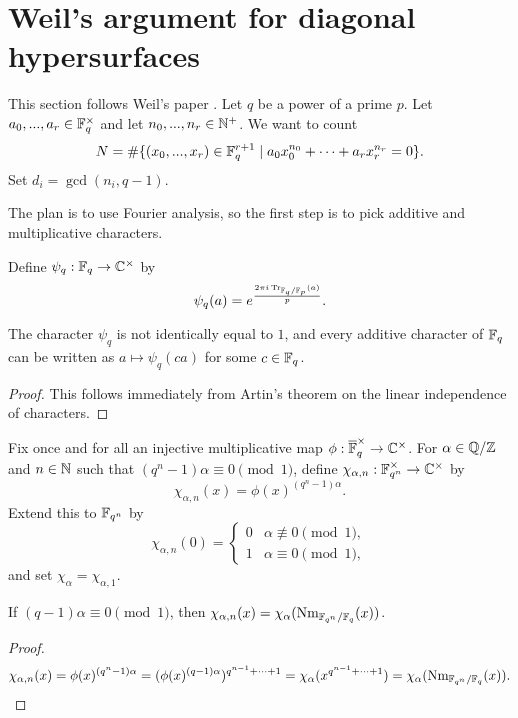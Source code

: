 \section{Weil's argument for diagonal hypersurfaces}

This section follows Weil's paper \cite{weil}. Let $q$ be a power of a prime $p$. Let $a_0, ..., a_r \in \mathbb{F}_q^\times$ and let $n_0, ..., n_r \in \mathbb{N}^+$. We want to count
\[
N = \#\{(x_0, ..., x_r)\in \mathbb{F}_q^{r+1} \mid a_0x_0^{n_0} + \cdots + a_rx_r^{n_r} = 0\}.
\]
Set $d_i = \gcd(n_i,q-1)$.

The plan is to use Fourier analysis, so the first step is to pick additive and multiplicative characters.

\begin{defn} Define $\psi_q:\mathbb{F}_q \rightarrow \mathbb{C}^\times$ by
\[
\psi_q(a) = e^{\frac{2\pi i\operatorname{Tr}_{\mathbb{F}_q/\mathbb{F}_p}(a)}{p}}.
\]
\end{defn}

\begin{prop} The character $\psi_q$ is not identically equal to $1$, and every additive character of $\mathbb{F}_q$ can be written as $a \mapsto \psi_q(ca)$ for some $c \in \mathbb{F}_q$.
\end{prop}
\begin{proof} This follows immediately from Artin's theorem on the linear independence of characters.
\end{proof}

\begin{defn} Fix once and for all an injective multiplicative map $\phi:\overline{\mathbb{F}}_q^\times \rightarrow \mathbb{C}^\times$. For $\alpha \in \mathbb{Q}/\mathbb{Z}$ and $n \in \mathbb{N}$ such that $(q^n-1)\alpha \equiv 0 \pmod{1}$, define $\chi_{\alpha,n} : \mathbb{F}_{q^n}^\times \rightarrow \mathbb{C}^\times$ by
\[
\chi_{\alpha,n}(x) = \phi(x)^{(q^n-1)\alpha}.
\]
Extend this to $\mathbb{F}_{q^n}$ by
\[
\chi_{\alpha,n}(0) = \begin{cases}0 & \alpha \not\equiv 0 \pmod{1},\\ 1 & \alpha \equiv 0 \pmod{1},\end{cases}
\]
and set $\chi_{\alpha} = \chi_{\alpha,1}$.
\end{defn}

\begin{prop} If $(q-1)\alpha \equiv 0 \pmod{1}$, then $\chi_{\alpha,n}(x) = \chi_{\alpha}(\operatorname{Nm}_{\mathbb{F}_{q^n}/\mathbb{F}_q}(x))$.
\end{prop}
\begin{proof}
\[
\chi_{\alpha,n}(x) = \phi(x)^{(q^n-1)\alpha} = (\phi(x)^{(q-1)\alpha})^{q^{n-1}+\cdots+1} = \chi_\alpha(x^{q^{n-1}+\cdots+1}) = \chi_\alpha(\operatorname{Nm}_{\mathbb{F}_{q^n}/\mathbb{F}_q}(x)).\qedhere
\]
\end{proof}

